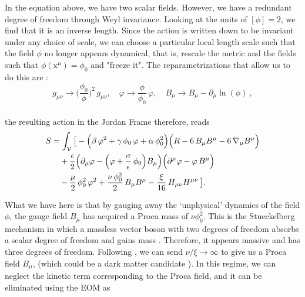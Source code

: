 \documentclass[aps,prd,reprint,preprintnumbers,showpacs,floatfix,nofootinbib,superscript address]{revtex4-2}
\newcommand{\wb}[1]{{\color[RGB]{255,0,0}{\textbf{\textit{[WB: #1]}}}}}
\begin{document}
In the equation above, we have two scalar fields. However, we have a redundant degree of freedom through Weyl invariance. Looking at the units of $[\phi] = 2$, we find that it is an inverse length. Since the action is written down to be invariant under any choice of scale, we can choose a particular local length scale such that the field $\phi$ no longer appears dynamical, that is, rescale the metric and the fields such that $\phi(\text{x}^\mu) = \phi_0$ and "freeze it". The reparametrizations that allow us to do this are :
\begin{equation}
    g_{\mu \nu}\rightarrow \bigg(\frac{\phi_0}{\phi}\bigg)^2\,g_{\mu \nu},\quad 
    \varphi\rightarrow\frac{\phi}{\phi_0}\,\varphi,\quad 
    B_{\mu}\rightarrow B_{\mu} - \partial_{\mu}\ln(\phi)\ ,
\end{equation}
\\
the resulting action in the Jordan Frame therefore, reads
\begin{equation}\label{29}
\begin{aligned}
S &= \int_\mathcal{V} \big[ -\Bigl(\beta\, \varphi^2 + \gamma\, \phi_0\, \varphi + \alpha\, \phi_0^2\Bigr)
\Bigl(R - 6\, B_{\mu} B^{\mu} - 6\, \nabla_{\mu} B^\mu\Bigr) \\
&\quad + \frac{\epsilon}{2} \Bigl(\partial_{\mu}\varphi - \Bigl(\varphi + \frac{\sigma}{\epsilon}\,\phi_0\Bigr)B_{\mu}\Bigr)
\Bigl(\partial^{\mu}\varphi - \varphi\,B^{\mu}\Bigr) \\
&\quad - \frac{\mu}{2}\, \phi_0^2\,\varphi^2 
+ \frac{\nu\,\phi_0^2}{2}\,B_{\mu} B^{\mu} 
- \frac{\xi}{16}\,H_{\mu\nu} H^{\mu\nu}\, \big] .
\end{aligned}
\end{equation}

What we have here is that by gauging away the `unphysical' dynamics of the field $\phi$, the gauge field $B_\mu$ has acquired a Proca mass of $\nu \phi_0^2$. This is the Stueckelberg mechanism in which a massless vector boson with two degrees of freedom absorbs a scalar degree of freedom and gains mass \cite{stueckelberg_wechselwirkungskrafte_1938, kors_aspects_2005}. Therefore, it appears massive and has three degrees of freedom. Following \cite{barker2024poincaregaugetheoryconformal}, we can send $\nu/\xi \rightarrow \infty$ to give us a Proca field $B_\mu$, (which could be a dark matter candidate \cite{Lasenby_2016}). In this regime, we can neglect the kinetic term corresponding to the Proca field, and it can be eliminated using the EOM as
\end{document}
